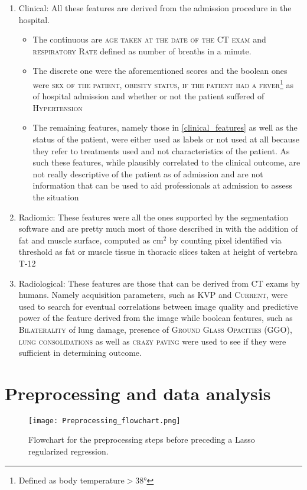 \begin{enumerate}
\item Clinical: All these features are derived from the admission procedure in the hospital.
	\begin{itemize}
        \item The continuous are {\scshape age taken at the date of the CT exam} and {\scshape respiratory Rate} defined as number of breaths in a minute.
		\item The discrete one were the aforementioned scores and the boolean ones were {\scshape sex of the patient, obesity status, if the patient had a fever}\footnote{Defined as body temperature$>$38°} as of hospital admission and whether or not the patient suffered of {\scshape Hypertension}
		\item The remaining features, namely those in \ref{clinical_features} as well as the \death status of the patient, were either used as labels or not used at all because they refer to treatments used and not characteristics of the patient. As such these features, while plausibly correlated to the clinical outcome, are not really descriptive of the patient as of admission and are not information that can be used to aid professionals at admission to assess the situation
	\end{itemize}
\item Radiomic: These features were all the ones supported by the segmentation software and are pretty much most of those described in \cite{IBSI} with the addition of fat and muscle surface, computed as cm$^2$ by counting pixel identified via threshold as fat or muscle tissue in thoracic slices taken at height of vertebra T-12
\item Radiological: These features are those that can be derived from CT exams by humans. Namely acquisition parameters, such as {\scshape KVP} and {\scshape Current}, were used to search for eventual correlations between image quality and predictive power of the feature derived from the image while boolean features, such as {\scshape Bilaterality} of lung damage, presence of {\scshape Ground Glass Opacities (GGO)}, {\scshape lung consolidations} as well as {\scshape crazy paving} were used to see if they were sufficient in determining outcome.
\end{enumerate}

\section{Preprocessing and data analysis}
\begin{figure}
\texttt{[image: Preprocessing\_flowchart.png]}
\caption{Flowchart for the preprocessing steps before preceding a Lasso regularized regression. \label{fig:preprocFlowchart}}
\end{figure}

